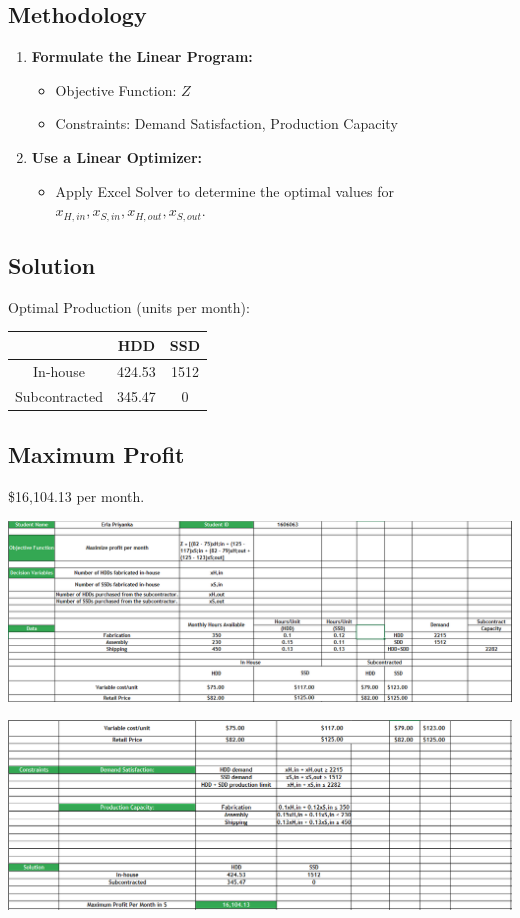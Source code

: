 \documentclass[10pt]{article}
\begin{document}
\subsection*{Methodology}

\begin{enumerate}
    \item \textbf{Formulate the Linear Program:}
    \begin{itemize}
        \item Objective Function: \( Z \)
        \item Constraints: Demand Satisfaction, Production Capacity
    \end{itemize}

    \item \textbf{Use a Linear Optimizer:}
    \begin{itemize}
        \item Apply Excel Solver  to determine the optimal values for \( x_{H,in}, x_{S,in}, x_{H,out}, x_{S,out} \).
    \end{itemize}
\end{enumerate}

\subsection*{Solution}
Optimal Production (units per month):

\begin{tabular}{|c|c|c|}
\hline
 & HDD & SSD \\
\hline
In-house & 424.53 & 1512 \\
Subcontracted & 345.47 & 0 \\
\hline
\end{tabular}

\subsection*{Maximum Profit}
\$16,104.13 per month.
\newpage

\begin{center}
    \includegraphics[width=\textwidth]{Q2.PNG} 
\end{center} 
\vspace{30pt}

\begin{center}
    \includegraphics[width=\textwidth]{Q22.PNG} 
\end{center} 
\end{document}

